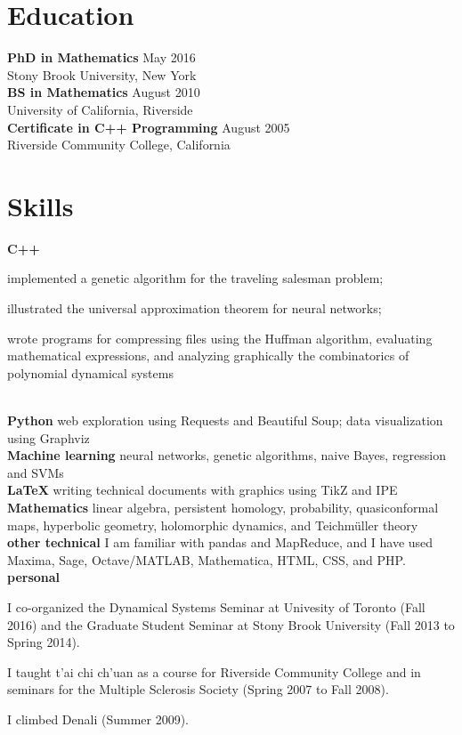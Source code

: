 \documentclass[11pt]{article}
\begin{document}
\section*{Education}
\noindent\textbf{PhD in Mathematics} \hfill May 2016\\
Stony Brook University, New York\\
\noindent\textbf{BS in Mathematics} \hfill August 2010\\
University of California, Riverside\\
\noindent\textbf{Certificate in C++ Programming} \hfill August 2005\\
Riverside Community College, California

\section*{Skills}
\noindent\textbf{C++}
\begin{inparaenum}
\item implemented a genetic algorithm for the traveling salesman problem;
\item illustrated the universal approximation theorem for neural networks;
\item wrote programs for compressing files using the Huffman algorithm, evaluating mathematical expressions, and analyzing graphically the combinatorics of polynomial dynamical systems
\end{inparaenum}
\\
\noindent\textbf{Python} web exploration using Requests and Beautiful Soup; data visualization using Graphviz\\
\noindent\textbf{Machine learning} neural networks, genetic algorithms, naive Bayes, regression and SVMs\\
\noindent\textbf{\LaTeX} writing technical documents with graphics using TikZ and IPE\\
\noindent\textbf{Mathematics} linear algebra, persistent homology, probability, quasiconformal maps, hyperbolic geometry, holomorphic dynamics, and Teichmüller theory\\
\noindent\textbf{other technical} I am familiar with pandas and MapReduce, and I have used Maxima, Sage, Octave/MATLAB, Mathematica, HTML, CSS, and PHP.\\
\noindent\textbf{personal}
\begin{inparaitem}
\item I co-organized the Dynamical Systems Seminar at Univesity of Toronto (Fall 2016) and the Graduate
Student Seminar at Stony Brook University (Fall 2013 to Spring 2014).
\item I taught t’ai chi ch’uan as a
course for Riverside Community College and in seminars for the Multiple Sclerosis Society (Spring
2007 to Fall 2008).
\item I climbed Denali (Summer 2009).
\end{inparaitem}
\end{document}
